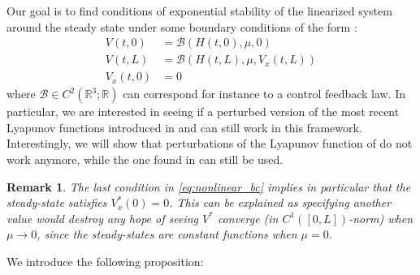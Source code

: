 \documentclass[11pt]{article}
\newtheorem{rmk}{Remark}[section]
\begin{document}
Our goal is to
find conditions of exponential stability of the linearized system around the steady state under some boundary conditions of the form :
\begin{equation}
\begin{split}
V(t,0) &= \mathcal B ( H(t,0), \mu, 0 ) \\
V(t,L) &= \mathcal B ( H(t,L), \mu, V_x(t,L) ) \\
V_x(t,0) &= 0
\end{split}
\label{eq:nonlinear_bc}
\end{equation} 
where $\mathcal B \in C^2( \mathbb R^3 ; \mathbb R)$ can correspond for instance to a control feedback law. {In particular, we are interested in seeing if a perturbed version of the most recent Lyapunov functions introduced in \cite{hayat2019quadratic} and \cite{bastin2017quadratic} can still work in this framework. Interestingly, we will show that perturbations of the Lyapunov function of \cite{hayat2019quadratic} do not work anymore, while the one found in \cite{bastin2017quadratic} can still be used.}

\begin{rmk}
The last condition in \eqref{eq:nonlinear_bc} implies in particular that the steady-state satisfies $V_{x}^{*}(0)=0$. This can be explained as specifying another value would destroy any hope of seeing $V^{*}$ converge (in $C^{1}([0,L])$-norm) when $\mu\rightarrow 0$, since the steady-states are constant functions when $\mu=0$.
\end{rmk}


We introduce the following proposition:
\end{document}
